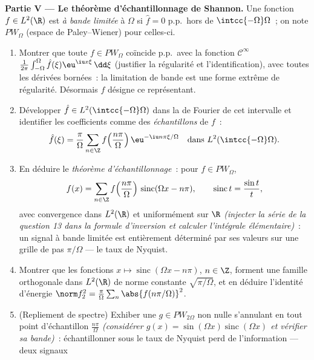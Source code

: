 \begin{problem}[{Problème du week-end --- $\partial_tu =
\partial^2_{xx}u$, résolue de bout en bout}]
\medskip
\noindent\textbf{Partie V --- Le théorème d'échantillonnage de
Shannon.} Une fonction $f \in L^2(\R)$ est \emph{à bande
limitée} à $\Omega$ si $\hat f = 0$ p.p.\ hors de
$\intcc{-\Omega}\Omega$~; on note $PW_\Omega$ (espace de
Paley--Wiener) pour celles-ci.
\begin{enumerate}[resume]
  \item Montrer que toute $f \in PW_\Omega$ coïncide p.p.\
        avec la fonction $\mathcal C^\infty$
        $\frac1{2\pi}\int_{-\Omega}^{\Omega}\hat
        f(\xi)\eu^{\iu x\xi}\,\dd\xi$ (justifier la
        régularité et l'identification), avec toutes les
        dérivées bornées~: la limitation de bande est une
        forme extrême de régularité. Désormais $f$ désigne
        ce représentant.
  \item Développer $\hat f \in L^2(\intcc{-\Omega}\Omega)$
        dans la  de Fourier de cet intervalle et
        identifier les coefficients comme des
        \emph{échantillons} de $f$~:
        \[
        \hat f(\xi) = \frac\pi\Omega\sum_{n\in\Z}
        f\Bigl(\frac{n\pi}\Omega\Bigr)\,
        \eu^{-\iu n\pi\xi/\Omega}
        \quad\text{dans } L^2(\intcc{-\Omega}\Omega) .
        \]
  \item En déduire le \emph{théorème d'échantillonnage}~: pour
        $f \in PW_\Omega$,
        \[
        f(x) = \sum_{n\in\Z}f\Bigl(\frac{n\pi}
        \Omega\Bigr)\,\operatorname{sinc}(\Omega x - n\pi),
        \qquad \operatorname{sinc}t = \frac{\sin t}t,
        \]
        avec convergence dans $L^2(\R)$ et uniformément sur
        $\R$ \emph{(injecter la série de la question 13 dans
        la formule d'inversion et calculer l'intégrale
        élémentaire)}~: un signal à bande limitée est
        entièrement déterminé par ses valeurs sur une grille
        de pas $\pi/\Omega$ --- le taux de Nyquist.
  \item Montrer que les fonctions $x \mapsto
        \operatorname{sinc}(\Omega x - n\pi)$, $n \in \Z$,
        forment une famille orthogonale dans $L^2(\R)$ de
        norme constante $\sqrt{\pi/\Omega}$, et en déduire
        l'identité d'énergie $\norm f_2^2 =
        \frac\pi\Omega\sum_n\abs{f(n\pi/\Omega)}^2$.
  \item (Repliement de spectre) Exhiber une $g \in
        PW_{2\Omega}$ non nulle s'annulant en tout point
        d'échantillon $\frac{n\pi}\Omega$ \emph{(considérer
        $g(x) = \sin(\Omega x)\operatorname{sinc}(\Omega x)$
        et vérifier sa bande)}~: échantillonner sous le taux
        de Nyquist perd de l'information --- deux signaux

\end{enumerate}
\end{problem}
